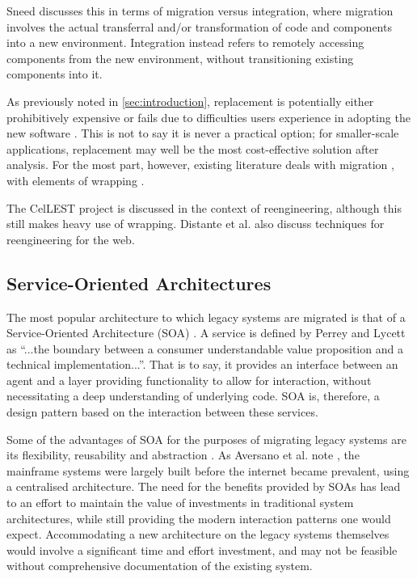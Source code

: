 \documentclass[12pt,journal,compsoc]{IEEEtran}
\begin{document}
Sneed \cite{Sneed2009} discusses this in terms of migration versus integration, where migration involves the actual transferral and/or transformation of code and components into a new environment. Integration instead refers to remotely accessing components from the new environment, without transitioning existing components into it.

As previously noted in \autoref{sec:introduction}, replacement is potentially either prohibitively expensive \cite{Duncan1996} or fails due to difficulties users experience in adopting the new software \cite{Sneed2011}. This is not to say it is never a practical option; for smaller-scale applications, replacement may well be the most cost-effective solution after analysis. For the most part, however, existing literature deals with migration \cite{Aversano2001,Bodhuin2002,Canfora2006,Canfora2000,Canfora2008,Lucia1997,Lewis2006,Sneed2011,Sneed2008,Sneed2009,Sneed2013,Wu2005,Sneed1996,Duncan1996}, with elements of wrapping \cite{Chiang2001,Canfora2008,Sneed1996,Sneed2003}.

The CelLEST project \cite{Stroulia2002} is discussed in the context of reengineering, although this still makes heavy use of wrapping. Distante et al. \cite{Distante2006} also discuss techniques for reengineering for the web.

\subsection{Service-Oriented Architectures}
\label{subsec:soa}
The most popular architecture to which legacy systems are migrated is that of a Service-Oriented Architecture (SOA) \cite{Sneed2008,Almonaies2010,Koschel2009,Canfora2006,Sneed2009,Canfora2008}. A service is defined by Perrey and Lycett \cite{Perrey2003} as ``...the boundary between a consumer understandable value proposition and a technical implementation...''. That is to say, it provides an interface between an agent and a layer providing functionality to allow for interaction, without necessitating a deep understanding of underlying code. SOA is, therefore, a design pattern based on the interaction between these services.

Some of the advantages of SOA for the purposes of migrating legacy systems are its flexibility, reusability and abstraction \cite{Almonaies2010}. As Aversano et al. note \cite{Aversano2001}, the mainframe systems were largely built before the internet became prevalent, using a centralised architecture. The need for the benefits provided by SOAs has lead to an effort to maintain the value of investments in traditional system architectures, while still providing the modern interaction patterns one would expect. Accommodating a new architecture on the legacy systems themselves would involve a significant time and effort investment, and may not be feasible without comprehensive documentation of the existing system.
\end{document}
